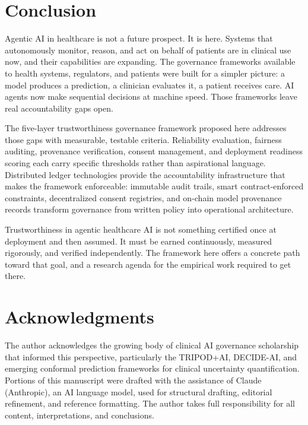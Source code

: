 \documentclass[12pt,a4paper]{article}
\begin{document}
\section*{Conclusion}

Agentic AI in healthcare is not a future prospect. It is here.
Systems that autonomously monitor, reason, and act on behalf of
patients are in clinical use now, and their capabilities are
expanding. The governance frameworks available to health systems,
regulators, and patients were built for a simpler picture: a
model produces a prediction, a clinician evaluates it, a patient
receives care. AI agents now make sequential decisions at machine
speed. Those frameworks leave real accountability gaps open.

The five-layer trustworthiness governance framework proposed here
addresses those gaps with measurable, testable criteria.
Reliability evaluation, fairness auditing, provenance
verification, consent management, and deployment readiness
scoring each carry specific thresholds rather than aspirational
language. Distributed ledger technologies provide the
accountability infrastructure that makes the framework
enforceable: immutable audit trails, smart contract-enforced
constraints, decentralized consent registries, and on-chain model
provenance records transform governance from written policy into
operational architecture.

Trustworthiness in agentic healthcare AI is not something
certified once at deployment and then assumed. It must be earned
continuously, measured rigorously, and verified independently.
The framework here offers a concrete path toward that goal, and a
research agenda for the empirical work required to get there.


\section*{Acknowledgments}
The author acknowledges the growing body of clinical AI
governance scholarship that informed this perspective,
particularly the TRIPOD+AI, DECIDE-AI, and emerging conformal
prediction frameworks for clinical uncertainty quantification.
Portions of this manuscript were drafted with the assistance of
Claude (Anthropic), an AI language model, used for structural
drafting, editorial refinement, and reference formatting. The
author takes full responsibility for all content, interpretations,
and conclusions.
\end{document}
